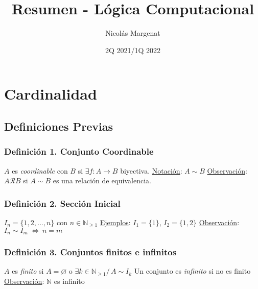 \documentclass{article}
\title{Resumen - Lógica Computacional}
\author{Nicolás Margenat}
\date{2Q 2021/1Q 2022}
\newcommand{\tq}{/\,}                                   %
\newcommand{\naturales}{\mathbb{N}}                     %
\newcommand{\relates}{\mathcal{R}}                      %
\newcommand{\Leftrightarrows}{\: \Leftrightarrow \:}    %
\begin{document}
\maketitle
\tableofcontents

\newpage
\section{Cardinalidad}
\subsection{Definiciones Previas}
\subsubsection*{Definición 1. Conjunto Coordinable}
$A$ es \emph{coordinable} con $B$ si $\exists f: A \rightarrow B$ biyectiva.
\newline\underline{Notación}: $A \sim B$
\newline\underline{Observación}: $A \relates B$ si $A \sim B$ es una relación de equivalencia.

\subsubsection*{Definición 2. Sección Inicial}
$I_n = \{ 1,2, ... , n \}$ con $n \in \naturales_{\geq 1}$
\newline \underline{Ejemplos}: $I_1 = \{ 1 \}$, $I_2 = \{ 1,2 \}$
\newline \underline{Observación}: $I_n \sim I_m \Leftrightarrows n = m$

\subsubsection*{Definición 3. Conjuntos finitos e infinitos}
$A$ es \emph{finito} si $A = \varnothing$ o $\exists k \in \naturales_{\geq 1} \tq A \sim I_k$
\newline Un conjunto es \emph{infinito} si no es finito
\newline \underline{Observación}: $\naturales$ es infinito
\end{document}
